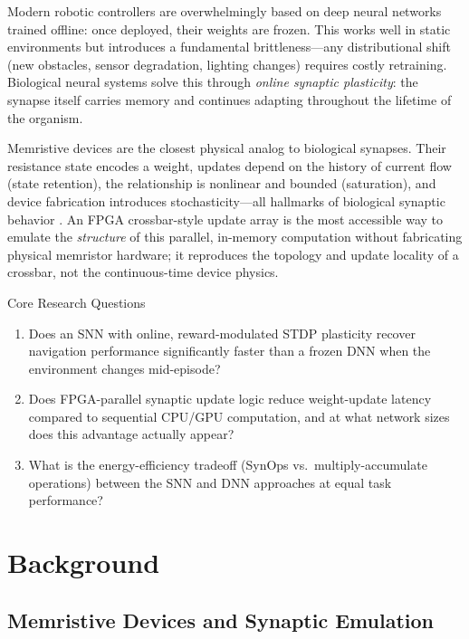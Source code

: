 \documentclass[11pt,a4paper]{article}
\begin{document}
Modern robotic controllers are overwhelmingly based on deep neural networks trained
offline: once deployed, their weights are frozen. This works well in static
environments but introduces a fundamental brittleness---any distributional shift (new
obstacles, sensor degradation, lighting changes) requires costly retraining. Biological
neural systems solve this through \emph{online synaptic plasticity}: the synapse itself
carries memory and continues adapting throughout the lifetime of the organism.

Memristive devices are the closest physical analog to biological synapses. Their
resistance state encodes a weight, updates depend on the history of current flow (state
retention), the relationship is nonlinear and bounded (saturation), and device
fabrication introduces stochasticity---all hallmarks of biological synaptic behavior
\cite{strukov2008}. An FPGA crossbar-style update array is the most accessible way to
emulate the \emph{structure} of this parallel, in-memory computation without
fabricating physical memristor hardware; it reproduces the topology and update locality
of a crossbar, not the continuous-time device physics.

\begin{keybox}{Core Research Questions}
\begin{enumerate}[label=\textbf{RQ\arabic*.}, leftmargin=*, itemsep=2pt]
  \item Does an SNN with online, reward-modulated STDP plasticity recover navigation
        performance significantly faster than a frozen DNN when the environment changes
        mid-episode?
  \item Does FPGA-parallel synaptic update logic reduce weight-update latency
        compared to sequential CPU/GPU computation, and at what network sizes does
        this advantage actually appear?
  \item What is the energy-efficiency tradeoff (SynOps vs.\ multiply-accumulate
        operations) between the SNN and DNN approaches at equal task performance?
\end{enumerate}
\end{keybox}

\section{Background}

\subsection{Memristive Devices and Synaptic Emulation}
\end{document}
